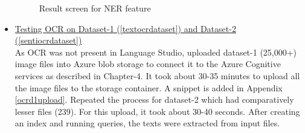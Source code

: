 \begin{itemize}
\begin {figure}[h!h]
        \centering
        \caption{Result screen for \acs{NER} feature}
        \label{d4sentiout}
    \end {figure}
    \item \uline{Testing \acs{OCR} on Dataset-1 (\ref{textocrdataset}) and Dataset-2 (\ref{sentiocrdataset})} \\
    As \acs{OCR} was not present in Language Studio, uploaded dataset-1 (25,000+) image files into Azure blob storage to connect it to the Azure Cognitive services as described in Chapter-4. It took about 30-35 minutes to upload all the image files to the storage container. A snippet is added in Appendix \ref{ocrd1upload}. Repeated the process for dataset-2 which had comparatively lesser files (239). For this upload, it took about 30-40 seconds. After creating an index and running queries, the texts were extracted from input files. 
    \begin {figure}[h!h]
        \centering

\end{figure}
\end{itemize}
